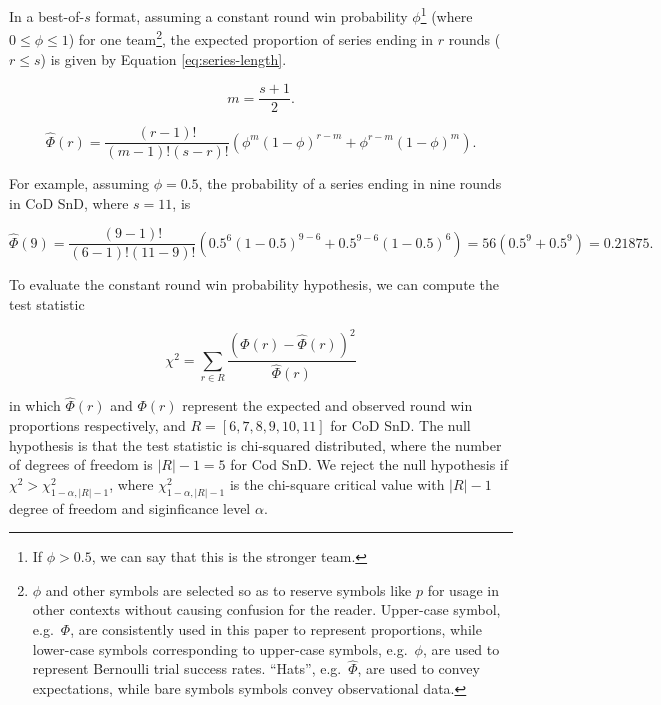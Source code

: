 \documentclass{article}
\begin{document}
In a best-of-\(s\) format, assuming a constant round win probability
\(\phi\)\footnote{If \(\phi > 0.5\), we can say that this is the
  stronger team.} (where \(0 \leq \phi \leq 1\)) for one
team\footnote{\(\phi\) and other symbols are selected so as to reserve
  symbols like \(p\) for usage in other contexts without causing
  confusion for the reader. Upper-case symbol, e.g.~\(\Phi\), are
  consistently used in this paper to represent proportions, while
  lower-case symbols corresponding to upper-case symbols, e.g.~\(\phi\),
  are used to represent Bernoulli trial success rates. ``Hats'',
  e.g.~\(\hat{\Phi}\), are used to convey expectations, while bare
  symbols symbols convey observational data.}, the expected proportion
of series ending in \(r\) rounds (\(r \leq s\)) is given by Equation
\ref{eq:series-length}.

\begin{equation}\label{eq:m}
m = \frac{s + 1}{2}.
\end{equation}

\begin{equation}\label{eq:series-length}
\hat{\Phi}(r) = \frac{(r - 1)!}{(m - 1)!(s - r)!}(\phi^{m}(1 - \phi)^{r - m} + \phi^{r - m}(1 - \phi)^m).
\end{equation}

For example, assuming \(\phi = 0.5\), the probability of a series ending
in nine rounds in CoD SnD, where \(s=11\), is

\[
\hat{\Phi}(9) = \frac{(9 - 1)!}{(6 - 1)!(11 - 9)!}(0.5^{6}(1 - 0.5)^{9 - 6} + 0.5^{9 - 6}(1 - 0.5)^6) = 56 (0.5^9 + 0.5^9) = 0.21875.
\]

To evaluate the constant round win probability hypothesis, we can
compute the test statistic

\begin{equation}\label{eq:chi-squ}
\chi^2 = \sum_{r \in R} \frac{(\Phi(r) - \hat{\Phi}(r))^2}{\hat{\Phi}(r)}
\end{equation}

in which \(\hat{\Phi}(r)\) and \(\Phi(r)\) represent the expected and
observed round win proportions respectively, and
\(R = [6, 7, 8, 9, 10, 11]\) for CoD SnD. The null hypothesis is that
the test statistic is chi-squared distributed, where the number of
degrees of freedom is \(\vert R \vert -1 = 5\) for Cod SnD. We reject
the null hypothesis if \(\chi^2 > \chi^2_{1-\alpha,\vert R \vert -1}\),
where \(\chi^2_{1-\alpha,\vert R \vert -1}\) is the chi-square critical
value with \(\vert R \vert -1\) degree of freedom and siginficance level
\(\alpha\).
\end{document}
